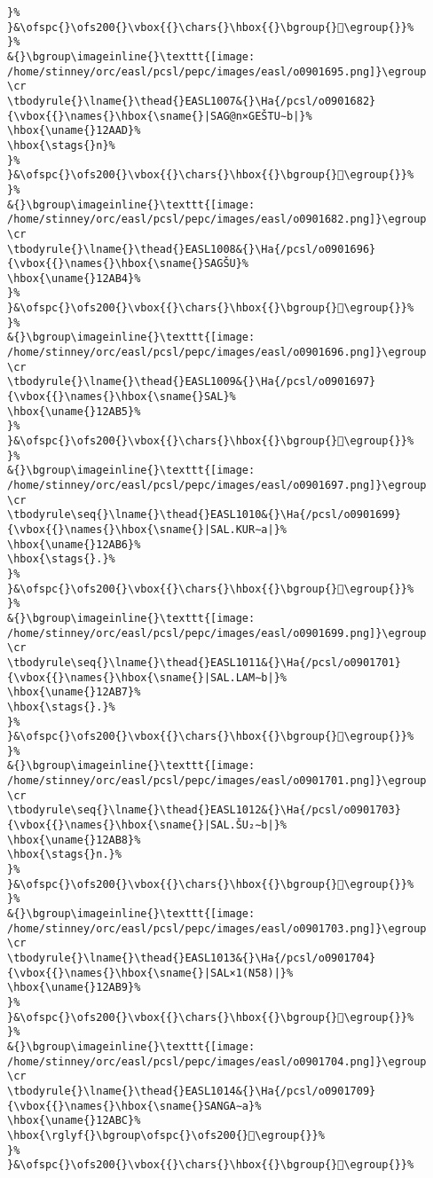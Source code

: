 \begin{verbatim}
}%
}&\ofspc{}\ofs200{}\vbox{{}\chars{}\hbox{{}\bgroup{}𒪬\egroup{}}%
}%
&{}\bgroup\imageinline{}\texttt{[image: /home/stinney/orc/easl/pcsl/pepc/images/easl/o0901695.png]}\egroup
\cr
\tbodyrule{}\lname{}\thead{}EASL1007&{}\Ha{/pcsl/o0901682}{\vbox{{}\names{}\hbox{\sname{}|SAG@n×GEŠTU∼b|}%
\hbox{\uname{}12AAD}%
\hbox{\stags{}n}%
}%
}&\ofspc{}\ofs200{}\vbox{{}\chars{}\hbox{{}\bgroup{}𒪭\egroup{}}%
}%
&{}\bgroup\imageinline{}\texttt{[image: /home/stinney/orc/easl/pcsl/pepc/images/easl/o0901682.png]}\egroup
\cr
\tbodyrule{}\lname{}\thead{}EASL1008&{}\Ha{/pcsl/o0901696}{\vbox{{}\names{}\hbox{\sname{}SAGŠU}%
\hbox{\uname{}12AB4}%
}%
}&\ofspc{}\ofs200{}\vbox{{}\chars{}\hbox{{}\bgroup{}𒪴\egroup{}}%
}%
&{}\bgroup\imageinline{}\texttt{[image: /home/stinney/orc/easl/pcsl/pepc/images/easl/o0901696.png]}\egroup
\cr
\tbodyrule{}\lname{}\thead{}EASL1009&{}\Ha{/pcsl/o0901697}{\vbox{{}\names{}\hbox{\sname{}SAL}%
\hbox{\uname{}12AB5}%
}%
}&\ofspc{}\ofs200{}\vbox{{}\chars{}\hbox{{}\bgroup{}𒪵\egroup{}}%
}%
&{}\bgroup\imageinline{}\texttt{[image: /home/stinney/orc/easl/pcsl/pepc/images/easl/o0901697.png]}\egroup
\cr
\tbodyrule\seq{}\lname{}\thead{}EASL1010&{}\Ha{/pcsl/o0901699}{\vbox{{}\names{}\hbox{\sname{}|SAL.KUR∼a|}%
\hbox{\uname{}12AB6}%
\hbox{\stags{}.}%
}%
}&\ofspc{}\ofs200{}\vbox{{}\chars{}\hbox{{}\bgroup{}𒪶\egroup{}}%
}%
&{}\bgroup\imageinline{}\texttt{[image: /home/stinney/orc/easl/pcsl/pepc/images/easl/o0901699.png]}\egroup
\cr
\tbodyrule\seq{}\lname{}\thead{}EASL1011&{}\Ha{/pcsl/o0901701}{\vbox{{}\names{}\hbox{\sname{}|SAL.LAM∼b|}%
\hbox{\uname{}12AB7}%
\hbox{\stags{}.}%
}%
}&\ofspc{}\ofs200{}\vbox{{}\chars{}\hbox{{}\bgroup{}𒪷\egroup{}}%
}%
&{}\bgroup\imageinline{}\texttt{[image: /home/stinney/orc/easl/pcsl/pepc/images/easl/o0901701.png]}\egroup
\cr
\tbodyrule\seq{}\lname{}\thead{}EASL1012&{}\Ha{/pcsl/o0901703}{\vbox{{}\names{}\hbox{\sname{}|SAL.ŠU₂∼b|}%
\hbox{\uname{}12AB8}%
\hbox{\stags{}n.}%
}%
}&\ofspc{}\ofs200{}\vbox{{}\chars{}\hbox{{}\bgroup{}𒪸\egroup{}}%
}%
&{}\bgroup\imageinline{}\texttt{[image: /home/stinney/orc/easl/pcsl/pepc/images/easl/o0901703.png]}\egroup
\cr
\tbodyrule{}\lname{}\thead{}EASL1013&{}\Ha{/pcsl/o0901704}{\vbox{{}\names{}\hbox{\sname{}|SAL×1(N58)|}%
\hbox{\uname{}12AB9}%
}%
}&\ofspc{}\ofs200{}\vbox{{}\chars{}\hbox{{}\bgroup{}𒪹\egroup{}}%
}%
&{}\bgroup\imageinline{}\texttt{[image: /home/stinney/orc/easl/pcsl/pepc/images/easl/o0901704.png]}\egroup
\cr
\tbodyrule{}\lname{}\thead{}EASL1014&{}\Ha{/pcsl/o0901709}{\vbox{{}\names{}\hbox{\sname{}SANGA∼a}%
\hbox{\uname{}12ABC}%
\hbox{\rglyf{}\bgroup\ofspc{}\ofs200{}𒪼\egroup{}}%
}%
}&\ofspc{}\ofs200{}\vbox{{}\chars{}\hbox{{}\bgroup{}𒪺\egroup{}}%

\end{verbatim}
